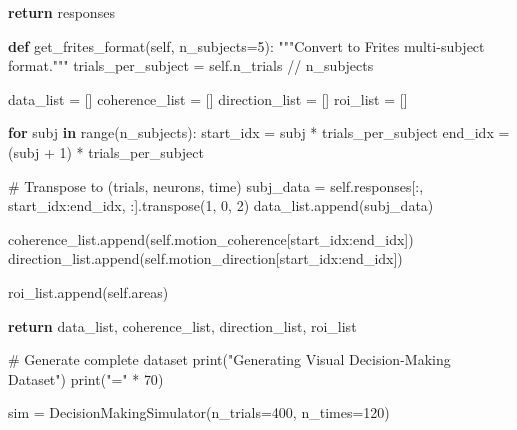 \documentclass[
  11pt,
  letterpaper,
  oneside,
  openany]{book}
\newenvironment{Shaded}{\begin{snugshade}}{\end{snugshade}}
\newcommand{\BuiltInTok}[1]{\textcolor[rgb]{0.00,0.23,0.31}{#1}}
\newcommand{\CommentTok}[1]{\textcolor[rgb]{0.37,0.37,0.37}{#1}}
\newcommand{\ControlFlowTok}[1]{\textcolor[rgb]{0.00,0.23,0.31}{\textbf{#1}}}
\newcommand{\DecValTok}[1]{\textcolor[rgb]{0.68,0.00,0.00}{#1}}
\newcommand{\KeywordTok}[1]{\textcolor[rgb]{0.00,0.23,0.31}{\textbf{#1}}}
\newcommand{\NormalTok}[1]{\textcolor[rgb]{0.00,0.23,0.31}{#1}}
\newcommand{\OperatorTok}[1]{\textcolor[rgb]{0.37,0.37,0.37}{#1}}
\newcommand{\StringTok}[1]{\textcolor[rgb]{0.13,0.47,0.30}{#1}}
\newcommand{\VariableTok}[1]{\textcolor[rgb]{0.07,0.07,0.07}{#1}}
\begin{document}
\begin{Shaded}
\begin{Highlighting}[]
        \ControlFlowTok{return}\NormalTok{ responses}
    
    \KeywordTok{def}\NormalTok{ get\_frites\_format(}\VariableTok{self}\NormalTok{, n\_subjects}\OperatorTok{=}\DecValTok{5}\NormalTok{):}
        \CommentTok{"""Convert to Frites multi{-}subject format."""}
\NormalTok{        trials\_per\_subject }\OperatorTok{=} \VariableTok{self}\NormalTok{.n\_trials }\OperatorTok{//}\NormalTok{ n\_subjects}
        
\NormalTok{        data\_list }\OperatorTok{=}\NormalTok{ []}
\NormalTok{        coherence\_list }\OperatorTok{=}\NormalTok{ []}
\NormalTok{        direction\_list }\OperatorTok{=}\NormalTok{ []}
\NormalTok{        roi\_list }\OperatorTok{=}\NormalTok{ []}
        
        \ControlFlowTok{for}\NormalTok{ subj }\KeywordTok{in} \BuiltInTok{range}\NormalTok{(n\_subjects):}
\NormalTok{            start\_idx }\OperatorTok{=}\NormalTok{ subj }\OperatorTok{*}\NormalTok{ trials\_per\_subject}
\NormalTok{            end\_idx }\OperatorTok{=}\NormalTok{ (subj }\OperatorTok{+} \DecValTok{1}\NormalTok{) }\OperatorTok{*}\NormalTok{ trials\_per\_subject}
            
            \CommentTok{\# Transpose to (trials, neurons, time)}
\NormalTok{            subj\_data }\OperatorTok{=} \VariableTok{self}\NormalTok{.responses[:, start\_idx:end\_idx, :].transpose(}\DecValTok{1}\NormalTok{, }\DecValTok{0}\NormalTok{, }\DecValTok{2}\NormalTok{)}
\NormalTok{            data\_list.append(subj\_data)}
            
\NormalTok{            coherence\_list.append(}\VariableTok{self}\NormalTok{.motion\_coherence[start\_idx:end\_idx])}
\NormalTok{            direction\_list.append(}\VariableTok{self}\NormalTok{.motion\_direction[start\_idx:end\_idx])}
            
\NormalTok{            roi\_list.append(}\VariableTok{self}\NormalTok{.areas)}
        
        \ControlFlowTok{return}\NormalTok{ data\_list, coherence\_list, direction\_list, roi\_list}

\CommentTok{\# Generate complete dataset}
\BuiltInTok{print}\NormalTok{(}\StringTok{"Generating Visual Decision{-}Making Dataset"}\NormalTok{)}
\BuiltInTok{print}\NormalTok{(}\StringTok{"="} \OperatorTok{*} \DecValTok{70}\NormalTok{)}

\NormalTok{sim }\OperatorTok{=}\NormalTok{ DecisionMakingSimulator(n\_trials}\OperatorTok{=}\DecValTok{400}\NormalTok{, n\_times}\OperatorTok{=}\DecValTok{120}\NormalTok{)}


\end{Highlighting}
\end{Shaded}
\end{document}
